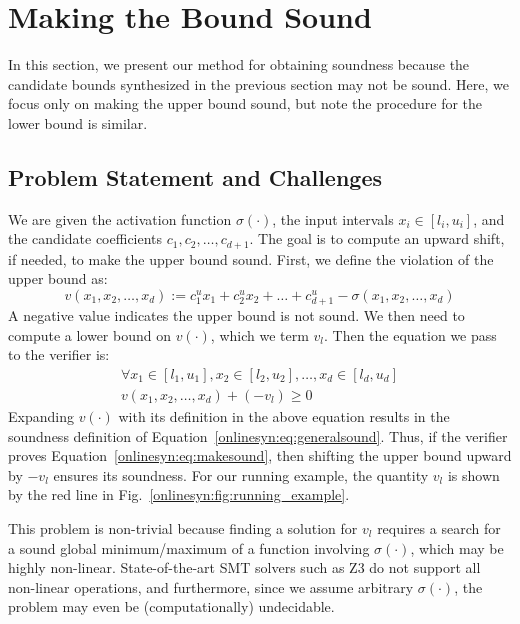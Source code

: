 \section{Making the Bound Sound}
\label{onlinesyn:sec:method-2}

In this section, we present our method for obtaining soundness because the
candidate bounds synthesized in the previous section may not be
sound. Here, we focus only on making the upper bound sound, but note the
procedure for the lower bound is similar.

\subsection{Problem Statement and Challenges}
We are given the activation function $ \sigma(\cdot) $, the input intervals $
x_i \in [l_i, u_i] $, and the candidate coefficients $ c_1, c_2,
\dots,c_{d+1} $. The goal is to compute an upward shift, if needed, to make the upper bound sound. First,
we define the violation of the upper bound as:
\begin{equation}
	v(x_1, x_2,\dots,x_d) := c^u_1x_1 + c^u_2x_2 + \dots + c^u_{d+1} -
	\sigma(x_1, x_2, \dots,x_d)
\end{equation}
A negative value indicates the upper bound is not sound. We then need to compute a
lower bound on $ v(\cdot) $, which we term $ v_l $. Then the equation we pass
to the verifier is:
\begin{equation} \label{onlinesyn:eq:makesound}
\begin{gathered}
\forall x_1 \in [l_1, u_1], x_2 \in [l_2, u_2], \dots, x_d\in[l_d, u_d]\\
v(x_1, x_2, \dots, x_d) + (-v_l) \geq 0
\end{gathered}
\end{equation}
Expanding $ v(\cdot) $ with its definition in the above equation results in the
soundness definition of Equation~\ref{onlinesyn:eq:generalsound}. Thus, if the
verifier
proves Equation~\ref{onlinesyn:eq:makesound}, then shifting the upper
bound upward by $ -v_l $ ensures its soundness.
%
For our running example, the quantity $ v_l $ is shown by the red line in
Fig.~\ref{onlinesyn:fig:running_example}.


This problem is non-trivial because finding a solution for $ v_l $ requires a
search for a sound global minimum/maximum of a function involving $
\sigma(\cdot) $, which may be highly non-linear.
State-of-the-art  SMT solvers such as  Z3 do not support all non-linear
operations, and furthermore, since we assume arbitrary $ \sigma(\cdot) $, the
problem may even be (computationally) undecidable.

